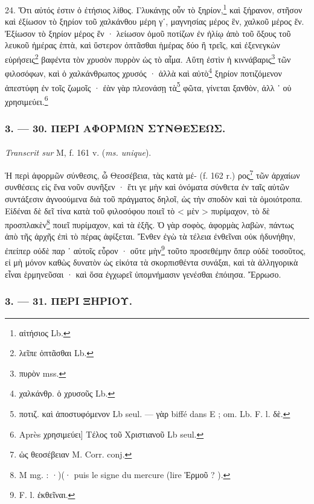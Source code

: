 \documentclass[a4paper, 11pt, oneside, polutonikogreek, french]{article}
\begin{document}
24. Ὅτι αὐτός ἐστιν ὁ ἐτήσιος λίθος. Γλυκάνῃς οὖν τὸ ξηρίον,\footnote{αἰτήσιος Lb.} καὶ ξήρανον, στῆσον καὶ ἐξίωσον τὸ ξηρίον τοῦ χαλκάνθου μέρη γʹ, μαγνησίας μέρος ἓν, χαλκοῦ μέρος ἕν. Ἐξίωσον τὸ ξηρίον μέρος ἕν · λείωσον ὁμοῦ ποτίζων ἐν ἡλίῳ ἀπὸ τοῦ ὄξους τοῦ λευκοῦ ἡμέρας ἑπτὰ, καὶ ὕστερον ὀπτᾶσθαι ἡμέρας δύο ἢ τρεῖς, καὶ ἐξενεγκὼν εὑρήσεις\footnote{λεῖπε ὀπτᾶσθαι Lb.} βαφέντα τὸν χρυσὸν πυρρὸν ὡς τὸ αἷμα. Αὕτη ἐστὶν ἡ κιννάβαρις\footnote{πυρὸν mss.} τῶν φιλοσόφων, καὶ ὁ χαλκάνθρωπος χρυσός · ἀλλὰ καὶ αὐτὸ\footnote{χαλκάνθρ. ὁ χρυσοῦς Lb.} ξηρίον ποτιζόμενον ἀπεστύφη ἐν τοῖς ζωμοῖς · ἐὰν γὰρ πλεονάσῃ τὰ\footnote{ποτιζ. καὶ ἀποστυφόμενον Lb seul. --- γὰρ biffé dans E ; om. Lb. F. l. δὲ.} φῶτα, γίνεται ξανθὸν, ἀλλ ᾽ οὐ χρησιμεύει.\footnote{Après χρησιμεύει] Τέλος τοῦ Χριστιανοῦ Lb seul.}

\bigskip
\centerline{\EightStarTaper}
\centerline{\EightStarTaper\EightStarTaper}
\bigskip

\subsubsection{3. --- 30. ΠΕΡΙ ΑΦΟΡΜΩΝ ΣΥΝΘΕΣΕΩΣ.}
\paragraph{}
\emph{Transcrit sur} M, f. 161 v. (\emph{ms. unique}).

\bigskip

Ἡ περὶ ἀφορμῶν σύνθεσις, ὦ Θεοσέβεια, τὰς κατὰ μέ- (f. 162 r.) ρος\footnote{ὡς θεοσέβειαν M. Corr. conj.} τῶν ἀρχαίων συνθέσεις εἰς ἕνα νοῦν συνῆξεν · ἔτι γε μὴν καὶ ὀνόματα σύνθετα ἐν ταῖς αὐτῶν συντάξεσιν ἀγνοούμενα διὰ τοῦ πράγματος δηλοῖ, ὡς τὴν σποδὸν καὶ τὰ ὁμοιότροπα. Εἰδέναι δὲ δεῖ τίνα κατὰ τοῦ φιλοσόφου ποιεῖ τὸ < μὲν > πυρίμαχον, τὸ δὲ προσπλακὲν\footnote{M mg. : ·)(· puis le signe du mercure (lire Ἑρμοῦ ? ).} ποιεῖ πυρίμαχον, καὶ τὰ ἑξῆς. Ὁ γὰρ σοφὸς, ἀφορμὰς λαβὼν, πάντως ἀπὸ τῆς ἀρχῆς ἐπὶ τὸ πέρας ἀφίξεται. Ἔνθεν ἐγὼ τὰ τέλεια ἐνθεῖναι οὐκ ἠδυνήθην, ἐπείπερ οὐδὲ παρ ᾽ αὐτοῖς εὗρον · οὔτε μὴν\footnote{F. l. ἐκθεῖναι.} τοῦτο προσεθέμην ὅπερ οὐδὲ τοσοῦτος, εἰ μὴ μόνον καθὼς δυνατὸν ὡς εἰκότα τὰ σκορπισθέντα συνάξαι, καὶ τὰ ἀλληγορικὰ εἶναι ἑρμηνεῦσαι · καὶ ὅσα ἐγχωρεῖ ὑπομνήμασιν γενέσθαι ἐπόιησα. Ἔρρωσο.

\bigskip
\centerline{\EightStarTaper}
\centerline{\EightStarTaper\EightStarTaper}
\bigskip

\subsubsection{3. --- 31. ΠΕΡΙ ΞΗΡΙΟΥ.}
\end{document}
